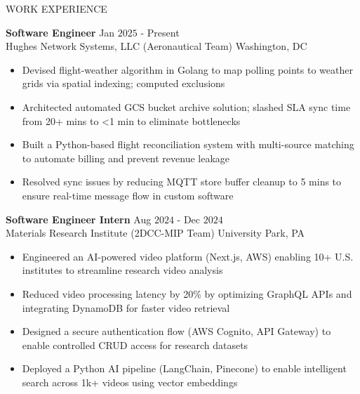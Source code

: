 \documentclass{resume} %
\begin{document}
\begin{rSection}{WORK EXPERIENCE}

{\bf Software Engineer} \hfill Jan $2025$ - Present\\
Hughes Network Systems, LLC (Aeronautical Team) \hfill Washington, DC
\begin{itemize}[itemsep = -4pt]
    \item Devised flight-weather algorithm in Golang to map polling points to weather grids via spatial indexing; computed exclusions
    \item Architected automated GCS bucket archive solution; slashed SLA sync time from 20+ mins to \textless 1 min to eliminate bottlenecks
    \item Built a Python-based flight reconciliation system with multi-source matching to automate billing and prevent revenue leakage
    \item Resolved sync issues by reducing MQTT store buffer cleanup to 5 mins to ensure real-time message flow in custom software
\end{itemize}

{\bf Software Engineer Intern} \hfill Aug $2024$ - Dec $2024$\\
Materials Research Institute (2DCC-MIP Team) \hfill University Park, PA
\begin{itemize}[itemsep = -4pt]
    \item Engineered an AI-powered video platform (Next.js, AWS) enabling 10+ U.S. institutes to streamline research video analysis
    \item Reduced video processing latency by 20\% by optimizing GraphQL APIs and integrating DynamoDB for faster video retrieval
    \item Designed a secure authentication flow (AWS Cognito, API Gateway) to enable controlled CRUD access for research datasets
    \item Deployed a Python AI pipeline (LangChain, Pinecone) to enable intelligent search across 1k+ videos using vector embeddings
\end{itemize}


\end{rSection}
\end{document}
